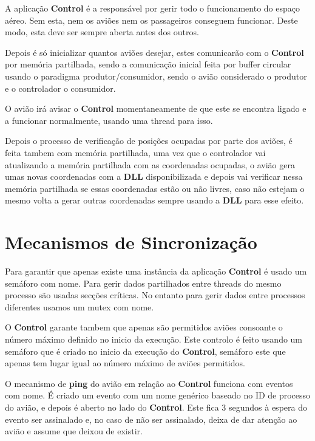 \documentclass[11pt]{article}
\begin{document}
	A aplicação \textbf{Control} é a responsável por gerir todo o funcionamento do espaço aéreo. Sem esta, nem os aviões nem os passageiros conseguem funcionar. Deste modo, esta deve ser sempre aberta antes dos outros.
	
	Depois é só inicializar quantos aviões desejar, estes comunicarão com o \textbf{Control} por memória partilhada, sendo a comunicação inicial feita por buffer circular usando o paradigma produtor/consumidor, sendo o avião considerado o produtor e o controlador o consumidor.
	
	O avião irá avisar o \textbf{Control} momentaneamente de que este se encontra ligado e a funcionar normalmente, usando uma thread para isso.
	
	Depois o processo de verificação de posições ocupadas por parte dos aviões, é feita tambem com memória partilhada, uma vez que o controlador vai atualizando a memória partilhada com as coordenadas ocupadas, o avião gera umas novas coordenadas com a \textbf{DLL} disponibilizada e depois vai verificar nessa memória partilhada se essas coordenadas estão ou não livres, caso não estejam o mesmo volta a gerar outras coordenadas sempre usando a \textbf{DLL} para esse efeito.
	
	
	\large
	\section{Mecanismos de Sincronização}
	\normalsize
	
	Para garantir que apenas existe uma instância da aplicação \textbf{Control} é usado um semáforo com nome. Para gerir dados partilhados entre threads do mesmo processo são usadas secções críticas. No entanto para gerir dados entre processos diferentes usamos um mutex com nome.
	
	O \textbf{Control} garante tambem que apenas são permitidos aviões consoante o número máximo definido no inicio da execução. Este controlo é feito usando um semáforo que é criado no inicio da execução do \textbf{Control}, semáforo este que apenas tem lugar igual ao número máximo de aviões permitidos.
	
	O mecanismo de \textbf{ping} do avião em relação ao \textbf{Control} funciona com eventos com nome. É criado um evento com um nome genérico baseado no ID de processo do avião, e depois é aberto no lado do \textbf{Control}. Este fica 3 segundos à espera do evento ser assinalado e, no caso de não ser assinalado, deixa de dar atenção ao avião e assume que deixou de existir.
	
\end{document}
